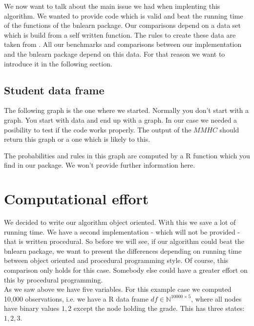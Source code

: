 		We now want to talk about the main issue we had when implenting this algorithm. We wanted to provide code which is valid and beat the running time of the functions of the bnlearn package. Our comparisons depend on a data set which is build from a self written function. The rules to create these data are taken from \cite{KoFr}. All our benchmarks and comparisons between our implementation and the bnlearn package depend on this data. For that reason we want to introduce it in the following section.

		\subsection{Student data frame}

			The following graph is the one where we started. Normally you don't start with a graph. You start with data and end up with a graph. In our case we needed a posibility to test if the code works properly. The output of the $MMHC$ should return this graph or a one which is likely to this.

			 \label{img.exampleGraph}

			The probabilities and rules in this graph are computed by a R function which you find in our package. We won't provide further information here.\\

	\section{Computational effort}

		We decided to write our algorithm object oriented. With this we save a lot of running time. We have a second implementation - which will not be provided - that is written procedural. So before we will see, if our algorithm could beat the bnlearn package, we want to present the differences depending on running time between object oriented and procedural programming style. Of course, this comparison only holds for this case. Somebody else could have a greater effort on this by procedural programming. \\
		As we saw above we have five variables. For this example case we computed 10,000 observations, i.e. we have a R data frame $df \in \mathbb{N}^{10000 \times 5}$, where all nodes have binary values $1, 2$ except the node holding the grade. This has three states: $1, 2, 3$.\\ \\

